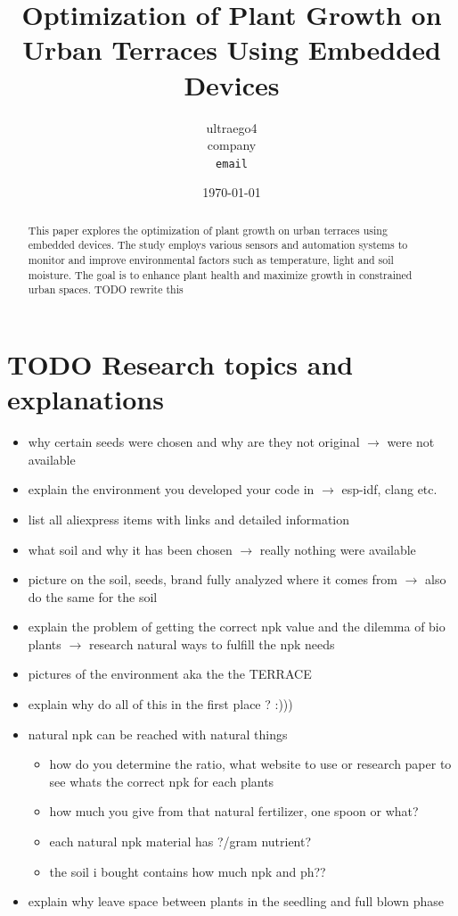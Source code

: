 \documentclass[a4paper,12pt]{article}
\title{Optimization of Plant Growth on Urban Terraces Using Embedded Devices}
\author{ultraego4 \\
	\small company \\
	\small \texttt{email}}
\date{\today}
\begin{document}
\maketitle

\newpage

\begin{abstract}
	This paper explores the optimization of plant growth on urban terraces using embedded devices. The study employs various sensors and automation systems to monitor and improve environmental factors such as temperature, light and soil moisture. The goal is to enhance plant health and maximize growth in constrained urban spaces. TODO rewrite this
\end{abstract}

\newpage

\tableofcontents

\newpage

\section{TODO Research topics and explanations}

\begin{itemize}
\item why certain seeds were chosen and why are they not original $\rightarrow$ were not available
\item explain the environment you developed your code in $\rightarrow$ esp-idf, clang etc.
\item list all aliexpress items with links and detailed information
\item what soil and why it has been chosen $\rightarrow$ really nothing were available
\item picture on the soil, seeds, brand fully analyzed where it comes from $\rightarrow$ also do the same for the soil
\item explain the problem of getting the correct npk value and the dilemma of bio plants $\rightarrow$ research natural ways to fulfill the npk needs
\item pictures of the environment aka the the TERRACE
\item explain why do all of this in the first place ? :)))
\item natural npk can be reached with natural things
\begin{itemize}
	\item{how do you determine the ratio, what website to use or research paper to see whats the correct npk for each plants}
	\item{how much you give from that natural fertilizer, one spoon or what?}
	\item{each natural npk material has ?/gram nutrient?}
	\item{the soil i bought contains how much npk and ph??}
\end{itemize}
\item explain why leave space between plants in the seedling and full blown phase
\end{itemize}
\end{document}
